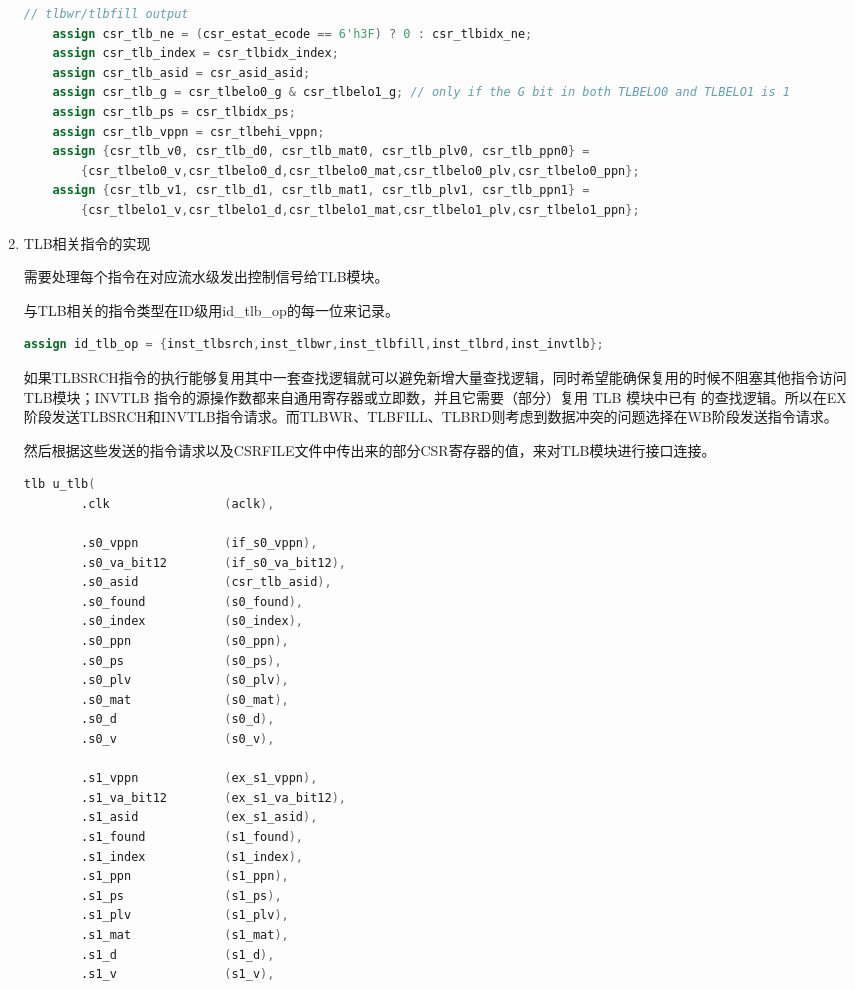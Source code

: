\documentclass[11pt]{article}
\begin{document}
\begin{enumerate}
\begin{lstlisting}[language=verilog]
    // tlbwr/tlbfill output
    assign csr_tlb_ne = (csr_estat_ecode == 6'h3F) ? 0 : csr_tlbidx_ne;
    assign csr_tlb_index = csr_tlbidx_index;
    assign csr_tlb_asid = csr_asid_asid;
    assign csr_tlb_g = csr_tlbelo0_g & csr_tlbelo1_g; // only if the G bit in both TLBELO0 and TLBELO1 is 1
    assign csr_tlb_ps = csr_tlbidx_ps;
    assign csr_tlb_vppn = csr_tlbehi_vppn;
    assign {csr_tlb_v0, csr_tlb_d0, csr_tlb_mat0, csr_tlb_plv0, csr_tlb_ppn0} = 
        {csr_tlbelo0_v,csr_tlbelo0_d,csr_tlbelo0_mat,csr_tlbelo0_plv,csr_tlbelo0_ppn};
    assign {csr_tlb_v1, csr_tlb_d1, csr_tlb_mat1, csr_tlb_plv1, csr_tlb_ppn1} = 
        {csr_tlbelo1_v,csr_tlbelo1_d,csr_tlbelo1_mat,csr_tlbelo1_plv,csr_tlbelo1_ppn};
  \end{lstlisting}
  
  \item TLB相关指令的实现

  需要处理每个指令在对应流水级发出控制信号给TLB模块。\par
  与TLB相关的指令类型在ID级用id\_tlb\_op的每一位来记录。\par
  \begin{lstlisting}[language=verilog]
    assign id_tlb_op = {inst_tlbsrch,inst_tlbwr,inst_tlbfill,inst_tlbrd,inst_invtlb};
  \end{lstlisting}
  如果TLBSRCH指令的执行能够复用其中一套查找逻辑就可以避免新增大量查找逻辑，同时希望能确保复用的时候不阻塞其他指令访问TLB模块；INVTLB 指令的源操作数都来自通用寄存器或立即数，并且它需要（部分）复用 TLB 模块中已有 的查找逻辑。所以在EX阶段发送TLBSRCH和INVTLB指令请求。而TLBWR、TLBFILL、TLBRD则考虑到数据冲突的问题选择在WB阶段发送指令请求。\par
  然后根据这些发送的指令请求以及CSRFILE文件中传出来的部分CSR寄存器的值，来对TLB模块进行接口连接。\par
  \begin{lstlisting}[language=verilog]
        tlb u_tlb(
        .clk                (aclk),

        .s0_vppn            (if_s0_vppn),
        .s0_va_bit12        (if_s0_va_bit12),
        .s0_asid            (csr_tlb_asid),
        .s0_found           (s0_found),
        .s0_index           (s0_index),
        .s0_ppn             (s0_ppn),
        .s0_ps              (s0_ps),
        .s0_plv             (s0_plv),
        .s0_mat             (s0_mat),
        .s0_d               (s0_d),
        .s0_v               (s0_v),

        .s1_vppn            (ex_s1_vppn),
        .s1_va_bit12        (ex_s1_va_bit12),
        .s1_asid            (ex_s1_asid),
        .s1_found           (s1_found),
        .s1_index           (s1_index),
        .s1_ppn             (s1_ppn),
        .s1_ps              (s1_ps),
        .s1_plv             (s1_plv),
        .s1_mat             (s1_mat),
        .s1_d               (s1_d),
        .s1_v               (s1_v),


\end{lstlisting}
\end{enumerate}
\end{document}

